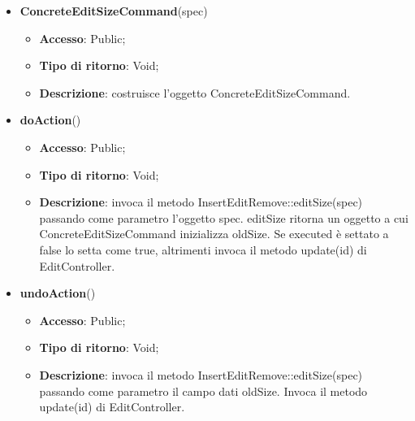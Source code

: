 {{{\begin{itemize}
\begin{itemize}
\begin{itemize}
\begin{itemize}
				\end{itemize}
			\end{itemize}
				\end{itemize}
				\end{itemize}
			\begin{itemize}
				\item \textbf{ConcreteEditSizeCommand}(spec)
				\begin{itemize}
					\item \textbf{Accesso}: Public;
					\item \textbf{Tipo di ritorno}: Void;
					\item \textbf{Descrizione}: costruisce l’oggetto ConcreteEditSizeCommand.
				\end{itemize}
				\item \textbf{doAction}()
				\begin{itemize}
					\item \textbf{Accesso}: Public;
					\item \textbf{Tipo di ritorno}: Void;
					\item \textbf{Descrizione}: invoca il metodo InsertEditRemove::editSize(spec) passando come parametro l'oggetto spec. editSize ritorna un oggetto a cui ConcreteEditSizeCommand inizializza oldSize. Se executed è settato a false lo setta come true, altrimenti invoca il metodo update(id) di EditController.
				\end{itemize}
				\item \textbf{undoAction}()
				\begin{itemize}
					\item \textbf{Accesso}: Public;
					\item \textbf{Tipo di ritorno}: Void;
					\item \textbf{Descrizione}: invoca il metodo InsertEditRemove::editSize(spec) passando come parametro il campo dati oldSize. Invoca il metodo update(id) di EditController.
				\end{itemize}
			\end{itemize}
			}
}}
